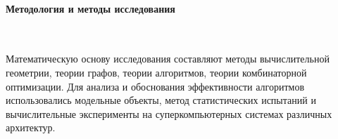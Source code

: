 \paragraph{Методология и методы исследования} \

Математическую основу исследования составляют методы вычислительной геометрии, теории графов, теории алгоритмов, теории комбинаторной оптимизации.
Для анализа и обоснования эффективности алгоритмов использовались модельные объекты, метод статистических испытаний и вычислительные эксперименты на суперкомпьютерных системах различных архитектур.